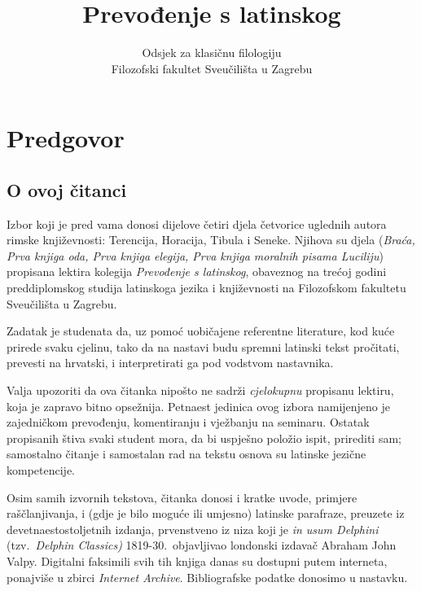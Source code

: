 \documentclass[a4paper,12pt,twoside]{report}
\newcommand{\subtitle}[1]{%
  \posttitle{%
    \par\end{center}
    \begin{center}\large#1\end{center}
    \vskip0.5em}%
}
\begin{document}
\title{Prevođenje s latinskog}
\subtitle{Čitanka}
\author{Odsjek za klasičnu filologiju\\
Filozofski fakultet Sveučilišta u Zagrebu}
\maketitle

\clearpage
\thispagestyle{empty}




\chapter*{Predgovor}

\section*{O ovoj čitanci}

Izbor koji je pred vama donosi dijelove četiri djela četvorice uglednih autora rimske književnosti: Terencija, Horacija, Tibula i Seneke. Njihova su djela (\textit{Braća, Prva knjiga oda, Prva knjiga elegija, Prva knjiga moralnih pisama Luciliju}) propisana lektira kolegija \textit{Prevođenje s latinskog}, obaveznog na trećoj godini preddiplomskog studija latinskoga jezika i književnosti na Filozofskom fakultetu Sveučilišta u Zagrebu.

Zadatak je studenata da, uz pomoć uobičajene referentne literature, kod kuće prirede svaku cjelinu, tako da na nastavi budu spremni latinski tekst pročitati, prevesti na hrvatski, i interpretirati ga pod vodstvom nastavnika.

Valja upozoriti da ova čitanka nipošto ne sadrži \textit{cjelokupnu} propisanu lektiru, koja je zapravo bitno opsežnija. Petnaest jedinica ovog izbora namijenjeno je zajedničkom prevođenju, komentiranju i vježbanju na seminaru. Ostatak propisanih štiva svaki student mora, da bi uspješno položio ispit, prirediti sam; samostalno čitanje i samostalan rad na tekstu osnova su latinske jezične kompetencije.

Osim samih izvornih tekstova, čitanka donosi i kratke uvode, primjere raščlanjivanja, i (gdje je bilo moguće ili umjesno) latinske parafraze, preuzete iz devetnaestostoljetnih izdanja, prvenstveno iz niza koji je \textit{in usum Delphini} (tzv.\ \textit{Delphin Classics)} 1819-30.\ objavljivao londonski izdavač Abraham John Valpy. Digitalni faksimili svih tih knjiga danas su dostupni putem interneta, ponajviše u zbirci \textit{Internet Archive}. Bibliografske podatke donosimo u nastavku. 
\end{document}
